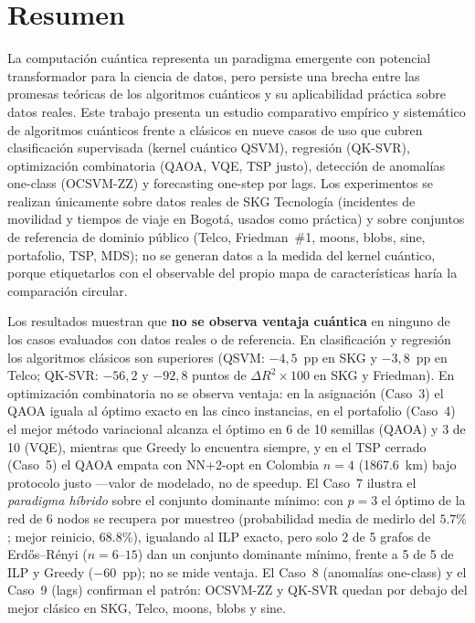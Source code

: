 \chapter{Resumen}

La computación cuántica representa un paradigma emergente con potencial transformador para la ciencia de datos, pero persiste una brecha entre las promesas teóricas de los algoritmos cuánticos y su aplicabilidad práctica sobre datos reales. Este trabajo presenta un estudio comparativo empírico y sistemático de algoritmos cuánticos frente a clásicos en nueve casos de uso que cubren clasificación supervisada (kernel cuántico QSVM), regresión (QK-SVR), optimización combinatoria (QAOA, VQE, TSP justo), detección de anomalías one-class (OCSVM-ZZ) y forecasting one-step por lags. Los experimentos se realizan únicamente sobre datos reales de SKG Tecnología (incidentes de movilidad y tiempos de viaje en Bogotá, usados como práctica) y sobre conjuntos de referencia de dominio público (Telco, Friedman~\#1, moons, blobs, sine, portafolio, TSP, MDS); no se generan datos a la medida del kernel cuántico, porque etiquetarlos con el observable del propio mapa de características haría la comparación circular.

Los resultados muestran que \textbf{no se observa ventaja cuántica} en ninguno de los casos evaluados con datos reales o de referencia. En clasificación y regresión los algoritmos clásicos son superiores (QSVM: $-4{,}5$~pp en SKG y $-3{,}8$~pp en Telco; QK-SVR: $-56{,}2$ y $-92{,}8$ puntos de $\Delta R^2\times100$ en SKG y Friedman). En optimización combinatoria no se observa ventaja: en la asignación (Caso~3) el QAOA iguala al óptimo exacto en las cinco instancias, en el portafolio (Caso~4) el mejor método variacional alcanza el óptimo en 6 de 10 semillas (QAOA) y 3 de 10 (VQE), mientras que Greedy lo encuentra siempre, y en el TSP cerrado (Caso~5) el QAOA empata con NN+2-opt en Colombia $n=4$ (1867.6~km) bajo protocolo justo ---valor de modelado, no de speedup. El Caso~7 ilustra el \emph{paradigma híbrido} sobre el conjunto dominante mínimo: con $p=3$ el óptimo de la red de 6 nodos se recupera por muestreo (probabilidad media de medirlo del $5.7\%$; mejor reinicio, $68.8\%$), igualando al ILP exacto, pero solo 2 de 5 grafos de Erdős--Rényi ($n=6$--$15$) dan un conjunto dominante mínimo, frente a 5 de 5 de ILP y Greedy ($-60$~pp); no se mide ventaja. El Caso~8 (anomalías one-class) y el Caso~9 (lags) confirman el patrón: OCSVM-ZZ y QK-SVR quedan por debajo del mejor clásico en SKG, Telco, moons, blobs y sine.

